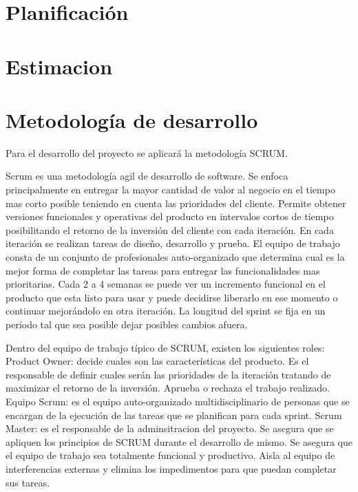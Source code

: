 \documentclass[12pt,a4paper]{article}
\begin{document}
	\section{Planificación}
	\section{Estimacion}
	\section{Metodología de desarrollo}
	
Para el desarrollo del proyecto se aplicará la metodología SCRUM.


Scrum es una metodología agil de desarrollo de software. Se enfoca principalmente en entregar la mayor cantidad de valor al negocio en el tiempo mas corto posible teniendo en cuenta las prioridades del cliente. Permite obtener versiones funcionales y operativas del producto en intervalos cortos de tiempo posibilitando el retorno de la inversión del cliente con cada iteración.
En cada iteración se realizan tareas de diseño, desarrollo y prueba. El equipo de trabajo consta de un conjunto de profesionales auto-organizado que determina cual es la mejor forma de completar las tareas para entregar las funcionalidades mas prioritarias.
Cada 2 a 4 semanas se puede ver un incremento funcional en el producto que esta listo para usar y puede decidirse liberarlo en ese momento o continuar mejorándolo en otra iteración. La longitud del sprint se fija en un período tal que sea posible dejar posibles cambios afuera.

Dentro del equipo de trabajo típico de SCRUM, existen los siguientes roles:
Product Owner: decide cuales son las características del producto. Es el responsable de definir cuales serán las prioridades de la iteración tratando de maximizar el retorno de la inversión. Aprueba o rechaza el trabajo realizado.
Equipo Scrum: es el equipo auto-organizado multidisciplinario de personas que se encargan de la ejecución de las tareas que se planifican para cada sprint.
Scrum Master: es el responsable de la adminsitracion del proyecto. Se asegura que se apliquen los principios de SCRUM durante el desarrollo de mismo. Se asegura que el equipo de trabajo sea totalmente funcional y productivo. Aisla al equipo de interferencias externas y elimina los impedimentos para que puedan completar sus tareas.
\end{document}

